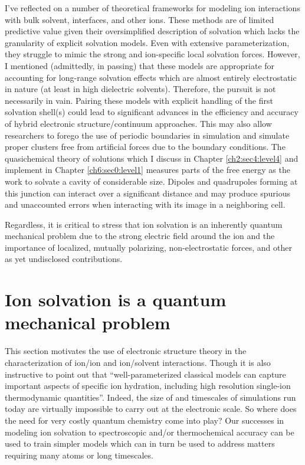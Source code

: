 \begin{intro}
    I've reflected on a number of theoretical frameworks for modeling ion interactions with bulk solvent, interfaces, and other ions. These methods are of limited predictive
    value given their oversimplified description of solvation which lacks the granularity of explicit solvation models\cite{jungwirth2006airwat}. Even with extensive parameterization, 
    they struggle to mimic the strong and ion-specific local solvation forces. However, I mentioned (admittedly, in passing) that these models are appropriate for accounting for 
    long-range solvation effects which are almost entirely electrostatic in nature (at least in high dielectric solvents). Therefore, the pursuit is not necessarily in vain. Pairing these
    models with explicit handling of the first solvation shell(s) could lead to significant advances in the efficiency and accuracy of hybrid electronic structure/continuum
    approaches. This may also allow researchers to forego the use of periodic boundaries in simulation and simulate proper clusters free from artificial forces due to the
    boundary conditions. The quasichemical theory of solutions which I discuss in Chapter \ref{ch2:sec4:level4} and implement in Chapter \ref{ch6:sec0:level1} measures parts of 
    the free energy as the work to solvate a cavity of considerable size. Dipoles and quadrupoles forming at this junction can interact over a significant distance and may produce
    spurious and unaccounted errors when interacting with its image in a neighboring cell\cite{remsing2014lp}.
   
    Regardless, it is critical to stress that ion solvation is an inherently quantum mechanical problem due to the strong electric field around the ion and the importance of localized, 
    mutually polarizing, non-electrostatic forces, and other as yet undisclosed contributions.
    
  \section{\label{ch1:sec3:level1}Ion solvation is a quantum mechanical problem}
   This section motivates the use of electronic structure theory in the characterization of ion/ion and ion/solvent interactions. Though it is also instructive to point out that 
   ``well-parameterized classical models can capture important aspects of specific ion hydration, including high resolution single-ion thermodynamic quantities''\cite{pollard2016review}. 
   Indeed, the size of and timescales of simulations run today are virtually impossible to carry out at the electronic scale. So where does the need for very costly quantum chemistry
   come into play? Our successes in modeling ion solvation to spectroscopic and/or thermochemical accuracy can be used to train simpler models which can in turn be used to address
   matters requiring many atoms or long timescales.
   

\end{intro}
